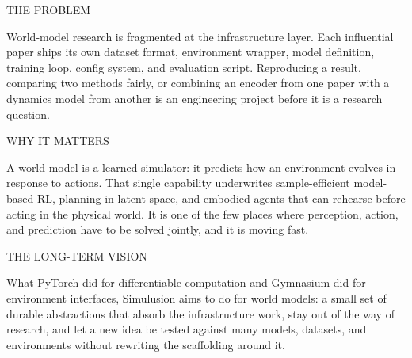 \documentclass[10pt,a4paper]{article}
\newcommand{\kicker}[1]{{\footnotesize\displayfont\color{accent}\MakeUppercase{#1}}}
\begin{document}
\begin{minipage}[t]{0.315\textwidth}
  \kicker{The problem}\par\vspace{1.5mm}
  {\footnotesize
  World-model research is fragmented at the infrastructure layer. Each influential paper ships its
  own dataset format, environment wrapper, model definition, training loop, config system, and
  evaluation script. Reproducing a result, comparing two methods fairly, or combining an encoder
  from one paper with a dynamics model from another is an engineering project before it is a
  research question.}
\end{minipage}\hfill
\begin{minipage}[t]{0.315\textwidth}
  \kicker{Why it matters}\par\vspace{1.5mm}
  {\footnotesize
  A world model is a learned simulator: it predicts how an environment evolves in response to
  actions. That single capability underwrites sample-efficient model-based RL, planning in latent
  space, and embodied agents that can rehearse before acting in the physical world. It is one of
  the few places where perception, action, and prediction have to be solved jointly, and it is
  moving fast.}
\end{minipage}\hfill
\begin{minipage}[t]{0.315\textwidth}
  \kicker{The long-term vision}\par\vspace{1.5mm}
  {\footnotesize
  What PyTorch did for differentiable computation and Gymnasium did for environment interfaces,
  Simulusion aims to do for world models: a small set of durable abstractions that absorb the
  infrastructure work, stay out of the way of research, and let a new idea be tested against many
  models, datasets, and environments without rewriting the scaffolding around it.}
\end{minipage}

\vspace{5mm}
\end{document}
